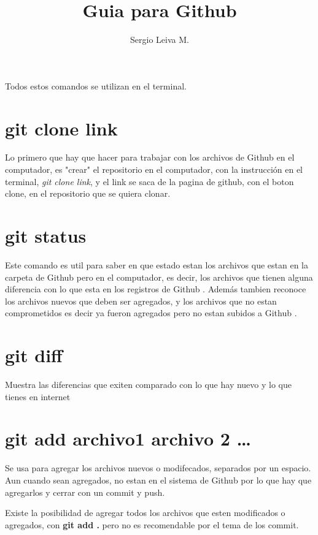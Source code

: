 \documentclass[letter,10pt]{article}
\newcommand{\g}{Github }
\begin{document}
\author{Sergio Leiva M.}
\title{\textbf{Guia para \g}}
\maketitle

Todos estos comandos se utilizan en el terminal.

\section{git clone link}
 Lo primero que hay que hacer para trabajar con los archivos de \g  en el computador, es "crear" el repositorio en el computador, con la instrucción en el terminal, \textit{git clone link}, y el link se saca de la pagina de github, con el boton clone, en el repositorio que se quiera clonar.

\section{git status}
 Este comando es util para saber en que estado estan los archivos que estan en la carpeta de \g pero en el computador, es decir, los archivos que tienen alguna diferencia con lo que esta en los registros de \g. Además tambien reconoce los archivos nuevos que deben ser agregados, y los archivos que no estan comprometidos es decir ya fueron agregados pero no estan subidos a \g.
 
\section{git diff}

 Muestra las diferencias que exiten comparado con lo que hay nuevo y lo que tienes en internet
 
\section{git add archivo1 archivo 2 \ldots} 
 
 Se usa para agregar los archivos nuevos o modifecados, separados por un espacio. Aun cuando sean agregados, no estan en el sistema de \g por lo que hay que agregarlos y cerrar con un commit y push.
 
 Existe la posibilidad de agregar todos los archivos que esten modificados o agregados, con \textbf{git add . } pero no es recomendable por el tema de los commit.
 
\end{document}
